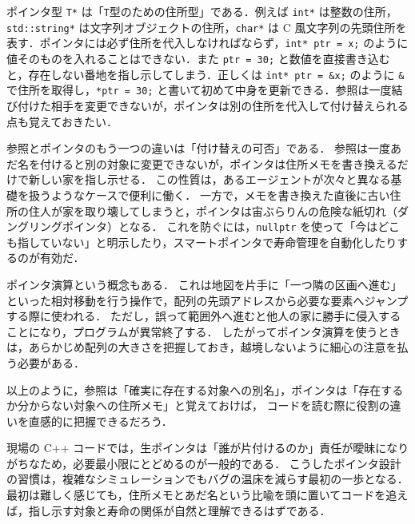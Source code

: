 \documentclass[10pt,letterpaper]{jsarticle}
\begin{document}
ポインタ型 \verb|T*| は「\verb|T|型のための住所型」である．例えば \verb|int*| は整数の住所，\verb|std::string*| は文字列オブジェクトの住所，\verb|char*| は C 風文字列の先頭住所を表す．ポインタには必ず住所を代入しなければならず，\verb|int* ptr = x;| のように値そのものを入れることはできない．また \verb|ptr = 30;| と数値を直接書き込むと，存在しない番地を指し示してしまう．正しくは \verb|int* ptr = &x;| のように \verb|&| で住所を取得し，\verb|*ptr = 30;| と書いて初めて中身を更新できる．参照は一度結び付けた相手を変更できないが，ポインタは別の住所を代入して付け替えられる点も覚えておきたい．


参照とポインタのもう一つの違いは「付け替えの可否」である．
参照は一度あだ名を付けると別の対象に変更できないが，ポインタは住所メモを書き換えるだけで新しい家を指し示せる．
この性質は，あるエージェントが次々と異なる基礎を扱うようなケースで便利に働く．
一方で，メモを書き換えた直後に古い住所の住人が家を取り壊してしまうと，ポインタは宙ぶらりんの危険な紙切れ（ダングリングポインタ）となる．
これを防ぐには，\verb|nullptr| を使って「今はどこも指していない」と明示したり，スマートポインタで寿命管理を自動化したりするのが有効だ．

ポインタ演算という概念もある．
これは地図を片手に「一つ隣の区画へ進む」といった相対移動を行う操作で，配列の先頭アドレスから必要な要素へジャンプする際に使われる．
ただし，誤って範囲外へ進むと他人の家に勝手に侵入することになり，プログラムが異常終了する．
したがってポインタ演算を使うときは，あらかじめ配列の大きさを把握しておき，越境しないように細心の注意を払う必要がある．

以上のように，参照は「確実に存在する対象への別名」，ポインタは「存在するか分からない対象への住所メモ」と覚えておけば，
コードを読む際に役割の違いを直感的に把握できるだろう．

現場の C++ コードでは，生ポインタは「誰が片付けるのか」責任が曖昧になりがちなため，必要最小限にとどめるのが一般的である．
こうしたポインタ設計の習慣は，複雑なシミュレーションでもバグの温床を減らす最初の一歩となる．
最初は難しく感じても，住所メモとあだ名という比喩を頭に置いてコードを追えば，指し示す対象と寿命の関係が自然と理解できるはずである．
\end{document}
